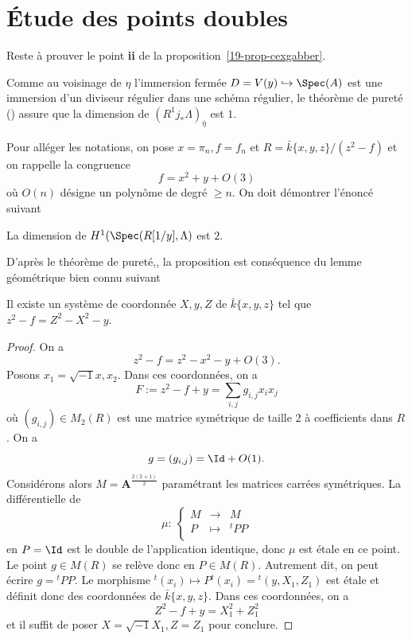 \documentclass[10pt]{../fichiers-configuration-latex/smfart}
\begin{document}
\section{Étude des points doubles} Reste à prouver le point \textbf{ii} de la
proposition~\ref{19-prop-cexgabber}.

Comme au voisinage de $\eta$ l'immersion fermée $D=V(y)\hookrightarrow\Spec(A)$ est une immersion
d'un diviseur régulier dans une schéma régulier, le théorème de pureté
() assure que la dimension de
$(R^1j_*\Lambda)_{\bar\eta}$ est $1$.

Pour alléger les notations, on pose $x=\pi_n, f=f_n$ et $R=\bar k\{x,y,z\}/(z^2-f)$ et on rappelle
la congruence $$f=x^2+y+O(3)$$ où $O(n)$ désigne un polynôme de degré $\geq n$. On doit démontrer
l'énoncé suivant

\begin{proposition} La dimension de $H^1(\Spec(R[1/y],\Lambda)$ est $2$.\end{proposition}

D'après le théorème de pureté,, la proposition est
conséquence du lemme géométrique bien connu suivant

\begin{lemme}\label{19-Morse} Il existe un système de coordonnée $X,y,Z$  de $\bar
k\{x,y,z\}$ tel que  $z^2-f=Z^2-X^2-y$.\end{lemme}


\begin{proof} On a $$z^2-f=z^2-x^2-y+O(3).$$ Posons $x_1=\sqrt{-1}x,x_2$. Dans ces coordonnées, on a
$$F:=z^2-f+y=\sum_{i,j}g_{i,j}x_ix_j$$ où $(g_{i,j})\in M_2(R)$ est une matrice symétrique de taille
2 à coefficients dans $R$. On a $$g=(g_{i,j})=\Id+O(1).$$ Considérons alors
$M=\mathbf{A}^{\frac{2(2+1)}{2}}$ paramétrant les matrices carrées symétriques. La différentielle de
$$\mu:\ \left\{ \begin{array}{ccc} M & \rightarrow& M \\ P &\mapsto & {}^tPP \\ \end{array}
\right.$$  en $P=\Id$ est le double de l'application identique, donc $\mu$ est étale en ce point. Le
point $g\in M(R)$ se relève donc en $P\in M(R)$. Autrement dit, on peut écrire $g={}^tPP$.  Le
morphisme ${}^t(x_i)\mapsto P{}^t(x_i)={}^t(y,X_1,Z_1)$ est étale et définit donc des coordonnées de
$\bar k\{x,y,z\}$. Dans ces coordonnées, on a $$Z^2-f+y=X_1^2+Z_1^2$$ et il suffit de poser
$X=\sqrt{-1}X_1, Z=Z_1$ pour conclure.\end{proof}
\end{document}
